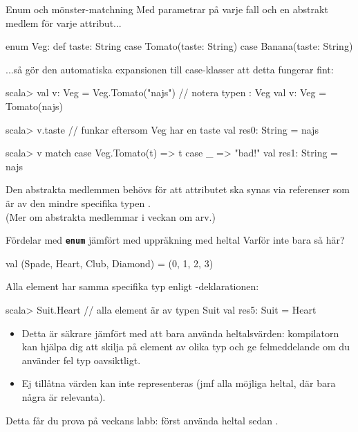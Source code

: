 \begin{Slide}{Enum och mönster-matchning}
\SlideFontSmall
Med parametrar på varje fall och en abstrakt medlem för varje attribut... 
\begin{Code}
enum Veg:
  def taste: String
  case Tomato(taste: String)
  case Banana(taste: String)
\end{Code}
...så gör den automatiska expansionen till case-klasser att detta fungerar fint: 
\begin{REPLsmall}
scala> val v: Veg = Veg.Tomato("najs") // notera typen : Veg
val v: Veg = Tomato(najs)

scala> v.taste  // funkar eftersom Veg har en taste
val res0: String = najs

scala> v match { case Veg.Tomato(t) => t case _ => "bad!" }
val res1: String = najs
\end{REPLsmall}
Den abstrakta medlemmen  behövs för att attributet ska synas via referenser som är av den mindre specifika typen .\\(Mer om abstrakta medlemmar i veckan om arv.)

\end{Slide}


\begin{Slide}{Fördelar med \texttt{\textbf{enum}} jämfört med uppräkning med heltal}
Varför inte bara så här?
\begin{Code}
val (Spade, Heart, Club, Diamond) = (0, 1, 2, 3)  
\end{Code}  
Alla element har samma specifika typ enligt -deklarationen:  
\begin{REPL}
scala> Suit.Heart              // alla element är av typen Suit 
val res5: Suit = Heart
\end{REPL}

\begin{itemize}
\item Detta är säkrare jämfört med att bara använda heltalsvärden: kompilatorn kan hjälpa dig att skilja på element av olika typ och ge felmeddelande om du använder fel typ oavsiktligt. 
\item Ej tillåtna värden kan inte representeras (jmf alla möjliga heltal, där bara några är relevanta).
\end{itemize}  
Detta får du prova på veckans labb: först använda heltal sedan .
\end{Slide}
